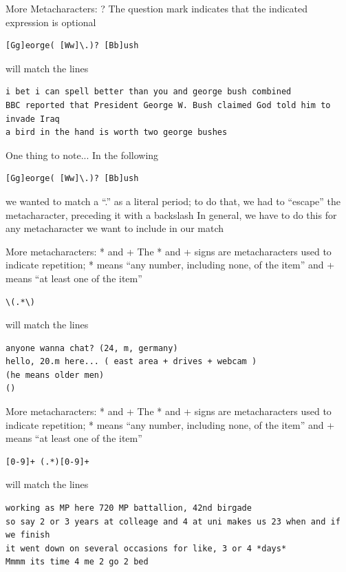 \documentclass{beamer}
\begin{document}
\begin{frame}[fragile]{More Metacharacters: ?}
The question mark indicates that the indicated expression is optional
\begin{verbatim}
[Gg]eorge( [Ww]\.)? [Bb]ush
\end{verbatim}
will match the lines 
\begin{verbatim}
i bet i can spell better than you and george bush combined
BBC reported that President George W. Bush claimed God told him to invade Iraq 
a bird in the hand is worth two george bushes 
\end{verbatim}
\end{frame}

\begin{frame}[fragile]{One thing to note...}
In the following
\begin{verbatim}
[Gg]eorge( [Ww]\.)? [Bb]ush
\end{verbatim}
we wanted to match a ``.'' as a literal period; to do that, we had to
``escape'' the metacharacter, preceding it with a backslash In
general, we have to do this for any metacharacter we want to include
in our match
\end{frame}

\begin{frame}[fragile]{More metacharacters: * and +}
The * and + signs are metacharacters used to indicate repetition; * 
means ``any number, including none, of the item'' and + means ``at 
least one of the item''
\begin{verbatim}
\(.*\)
\end{verbatim}
will match the lines 
\begin{verbatim}
anyone wanna chat? (24, m, germany)
hello, 20.m here... ( east area + drives + webcam ) 
(he means older men) 
()
\end{verbatim}
\end{frame}

\begin{frame}[fragile]{More metacharacters: * and +}
The * and + signs are metacharacters used to indicate repetition; * 
means ``any number, including none, of the item'' and + means ``at 
least one of the item''
\begin{verbatim}
[0-9]+ (.*)[0-9]+
\end{verbatim}
will match the lines 
\begin{verbatim}
working as MP here 720 MP battallion, 42nd birgade 
so say 2 or 3 years at colleage and 4 at uni makes us 23 when and if we finish
it went down on several occasions for like, 3 or 4 *days*
Mmmm its time 4 me 2 go 2 bed
\end{verbatim}
\end{frame}
\end{document}
